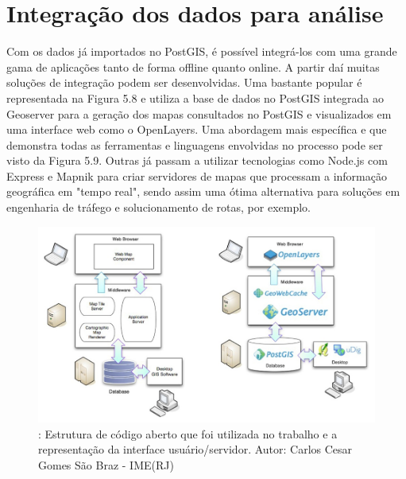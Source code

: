 	\section{Integração dos dados para análise}
	
	Com os dados já importados no PostGIS, é possível integrá-los com uma grande gama de aplicações tanto de forma offline quanto online. A partir daí muitas soluções de integração podem ser desenvolvidas. Uma bastante popular é representada na Figura 5.8 e utiliza a base de dados no PostGIS integrada ao Geoserver para a geração dos mapas consultados no PostGIS e visualizados em uma interface web como o OpenLayers. Uma abordagem mais específica e que demonstra todas as ferramentas e linguagens envolvidas no processo pode ser visto da Figura 5.9. Outras já passam a utilizar tecnologias como Node.js com Express e Mapnik para criar servidores de mapas que processam a informação geográfica em "tempo real", sendo assim uma ótima alternativa para soluções em engenharia de tráfego e solucionamento de rotas, por exemplo.
	
	\begin{figure}
		\centering
		\includegraphics[width=1\linewidth]{data/estrutura_opensource}
		\caption{: Estrutura de código aberto que foi utilizada no trabalho e a representação da interface usuário/servidor. Autor: Carlos Cesar Gomes São Braz - IME(RJ)}
		\label{fig:estruturaopensource}
	\end{figure}

\newpage
	
